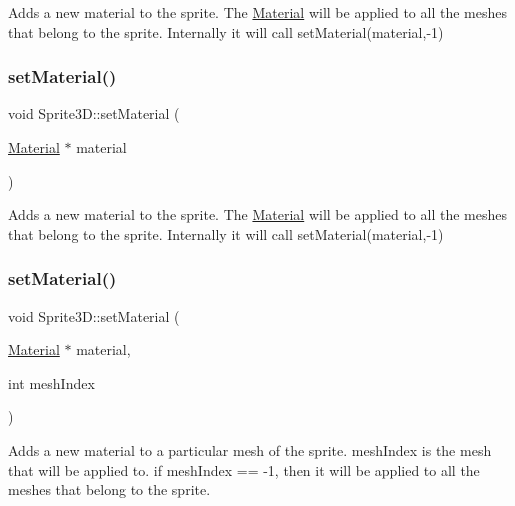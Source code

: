 Adds a new material to the sprite. The \hyperlink{classMaterial}{Material} will be applied to all the meshes that belong to the sprite. Internally it will call {\ttfamily set\+Material(material,-\/1)} \mbox{\label{classSprite3D_ac984a24d1e5fc0e9071eef14e5041c42}} 
\subsubsection{\texorpdfstring{set\+Material()}{setMaterial()}\hspace{0.1cm}{\footnotesize\ttfamily [2/4]}}
{\footnotesize\ttfamily void Sprite3\+D\+::set\+Material (\begin{DoxyParamCaption}\item[{\hyperlink{classMaterial}{Material} $\ast$}]{material }\end{DoxyParamCaption})}

Adds a new material to the sprite. The \hyperlink{classMaterial}{Material} will be applied to all the meshes that belong to the sprite. Internally it will call {\ttfamily set\+Material(material,-\/1)} \mbox{\label{classSprite3D_a83fef9c35a0cb8866426b3e709ed5fab}} 
\subsubsection{\texorpdfstring{set\+Material()}{setMaterial()}\hspace{0.1cm}{\footnotesize\ttfamily [3/4]}}
{\footnotesize\ttfamily void Sprite3\+D\+::set\+Material (\begin{DoxyParamCaption}\item[{\hyperlink{classMaterial}{Material} $\ast$}]{material,  }\item[{int}]{mesh\+Index }\end{DoxyParamCaption})}

Adds a new material to a particular mesh of the sprite. mesh\+Index is the mesh that will be applied to. if mesh\+Index == -\/1, then it will be applied to all the meshes that belong to the sprite. \mbox{\label{classSprite3D_a83fef9c35a0cb8866426b3e709ed5fab}} 
